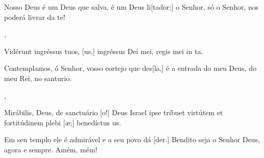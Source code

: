 {    {\item {}Nosso Deus é um Deus que salva, é um Deus li[tador;] o Senhor, só o Senhor, nos poderá livrar da te!~\Responsorium},
  {\item {}Vidérunt ingréssus tuos, [us,] ingréssus Dei mei, regis mei in ta.~\Responsorium}%
    {\item {}Contemplamos, ó Senhor, vosso cortejo que des[\-la,] é a entrada do meu Deus, do meu Rei, no santurio.~\Responsorium},
  {\item {}Mirábilis, Deus, de sanctuário [o!] Deus Israel ipse tríbuet virtútem et fortitúdinem plebi [æ;] benedíctus us.~\Responsorium}%
    {\item {}Em seu templo ele é admirável e a seu povo dá [der.] Bendito seja o Senhor Deus, agora e sempre. Amém, mém!~\Responsorium}
}